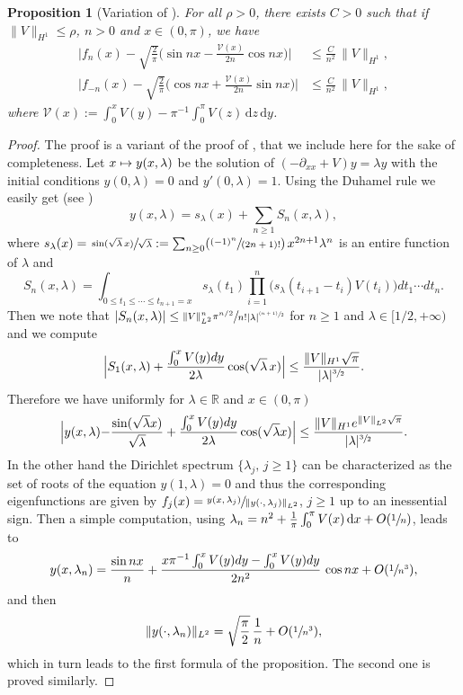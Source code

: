 \documentclass[11pt]{article}
\newcommand\mto{\mathchoice{\longmapsto}{\mapsto}{\mapsto}{\mapsto}}
\newcommand{\Psfrac}[2]{(\sfrac{#1}{#2})}
\newcommand{\psfrac}[2]{\sfrac{(#1)}{#2}}
\newtheorem{proposition}[theorem]{Proposition}
\theoremstyle{definition}
\begin{document}
\begin{proposition}[Variation of {\cite[Th.\,4, p.\,16]{PT}}] \label{prop_desc_fn}
For all $\rho>0$, there exists $C>0$ such that if $\|V\|_{H^1}\leq \rho$, $n>0$ and $x\in (0,\pi)$, we have
\begin{align*}
\biggl|f_n(x)-\sqrt{\frac2\pi}\Big(\sin nx- \frac{\mathcal{V}(x)}{2n}\cos nx \Big)\biggr|&\leq \frac C{n^2}\,\|V\|_{H^1},
\\
\biggl|f_{-n}(x)-\sqrt{\frac2\pi}\Big(\cos nx+\frac{\mathcal{V}(x)}{2n}\sin nx \Big)\biggr|&\leq \frac C{n^2}\,\|V\|_{H^1},
\end{align*}
where $\mathcal{V}(x):= \int_0^x V(y) - \pi^{-1}\int_0^\pi V(z) \,\mathrm{d}z\, \mathrm{d}y$.
\end{proposition}
\begin{proof}
The proof is a variant of the proof of \cite[Th.\,4, p.\,16]{PT}, that we include here for the sake of completeness. Let $x\mto y(x,\lambda)$ be the solution of $(-\partial_{xx}+V)y=\lambda y$ with the initial conditions $y(0,\lambda)=0$ and $y'(0,\lambda)=1$.
Using the Duhamel rule we easily get (see \cite[Th.\,1, p.\,7]{PT})
\[
y(x,\lambda)=s_\lambda(x)+\sum_{n\geq1}S_n(x,\lambda),
\]
where $s_\lambda(x)=\sfrac{\sin(\sqrt\lambda\, x)}{\sqrt \lambda}:=\sum_{n\geq0}\Psfrac{(-1)^n}{(2n+1)!}\,x^{2n+1}\lambda^n$ is an entire function of $\lambda$ and
\[
S_n(x,\lambda)=\int_{0\leq t_1\leq\cdots\leq t_{n+1}=x}s_\lambda(t_1)\prod_{i=1}^n\big(s_\lambda(t_{i+1}-t_i)V(t_i)\big)dt_1\cdots dt_n.
\]
Then we note that $ |S_n(x,\lambda)|\leq \sfrac{\|V\|^n_{L^2} { \pi^{n/2} }}{n!|\lambda|^{\psfrac{n+1}{2}}}$ for $n\geq 1$ {and $\lambda\in[1/2,+\infty)$}
and we compute
\[
\Bigl|S_1(x,\lambda)+\frac{ \int_0^x V(y)dy}{2\lambda}\cos(\sqrt\lambda\, x)\Bigr|\leq \frac{\|V\|_{H^1}\sqrt\pi}{|\lambda|^{\sfrac32}}.
\]
Therefore we have uniformly for $\lambda\in\mathbb R$ and $x\in(0,\pi)$
\[
\Bigl|y(x,\lambda){ -\frac{\sin(\sqrt{\lambda} x)}{\sqrt{\lambda}} }+ \frac{ \int_0^x V(y)dy}{2\lambda}\cos (\sqrt\lambda x)\Bigr|\leq \frac{\|V\|_{H^1}e^{\|V\|_{L^2} { \sqrt{\pi} } }}{|\lambda|^{\sfrac32}}.
\]
In the other hand the Dirichlet spectrum $\{\lambda_j,\, j\geq1\}$ can be characterized as the set of roots of the equation $y(1,\lambda)=0$ and thus
the corresponding eigenfunctions are given by $f_j(x)=\sfrac{y(x,\lambda_j)}{\|y(\cdot,\lambda_j)\|_{L^2}}$, $j\geq1$ up to an inessential sign. Then a simple computation, using $\lambda_n = n^2 + \frac1\pi \int_{0}^{\pi} V(x)\, \mathrm{d}x + O(\sfrac1n)$, leads to
\[
y(x,\lambda_n)=\frac{\sin nx}{n}+ \frac{x\pi^{-1}\int_0^x V(y)dy-\int_0^x V(y)dy}{2n^2}\,\cos nx+O(\sfrac 1{n^3}),
\]
and then
\[
\|y(\cdot,\lambda_n)\|_{L^2}= \sqrt{\frac\pi 2}\,\frac1n+O(\sfrac1{n^3}),
\]
which in turn leads to the first formula of the proposition. The second one is proved similarly.
\end{proof}
\end{document}
